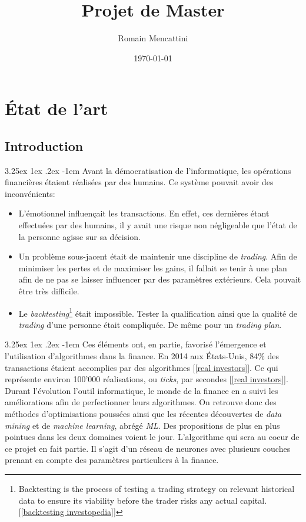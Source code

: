 \documentclass[a4paper, 11pt]{article}
\title{Projet de Master}
\author{Romain Mencattini}
\date{\today}
\makeatletter
\renewcommand\paragraph{\@startsection{paragraph}{5}{\z@}%
  {3.25ex \@plus1ex \@minus.2ex}%
  {-1em}%
  {\normalfont\normalsize\bfseries}}
\makeatother
\begin{document}
\maketitle
\newpage
\tableofcontents
\newpage

\section{État de l'art}
\subsection{Introduction}
\paragraph{}
Avant la démocratisation de l'informatique, les opérations financières étaient réalisées par des humains. Ce système pouvait avoir des inconvénients:
\begin{itemize}
\item L'émotionnel influençait les transactions. En effet, ces dernières étant effectuées par des humains, il y avait une risque non négligeable que l'état de la personne agisse sur sa décision.
\item Un problème sous-jacent était de maintenir une discipline de \textit{trading}. Afin de minimiser les pertes et de maximiser les gains, il fallait se tenir à une plan afin de ne pas se laisser influencer par des paramètres extérieurs. Cela pouvait être très difficile.
\item Le \textit{backtesting}\footnote{Backtesting is the process of testing a trading strategy on relevant historical data to ensure its viability before the trader risks any actual capital. [\ref{backtesting investopedia}]} était impossible. Tester la qualification ainsi que la qualité de \textit{trading} d'une personne était compliquée. De même pour un \textit{trading plan}.
\end{itemize}

\paragraph{}
Ces éléments ont, en partie, favorisé l'émergence et l'utilisation d'algorithmes dans la finance. En 2014 aux États-Unis, 84\% des transactions étaient accomplies par des algorithmes [\ref{real investors}]. Ce qui représente environ 100'000 réalisations, ou \textit{ticks}, par secondes [\ref{real investors}].
Durant l'évolution l'outil informatique, le monde de la finance en a suivi les améliorations afin de perfectionner leurs algorithmes.
On retrouve donc des méthodes d'optimisations poussées ainsi que les récentes découvertes de \textit{data mining} et de \textit{machine learning}, abrégé \textit{ML}. Des propositions de plus en plus pointues dans les deux domaines voient le jour. L'algorithme qui sera au coeur de ce projet en fait partie. Il s'agit d'un réseau de neurones avec plusieurs couches prenant en compte des paramètres particuliers à la finance.
\end{document}
